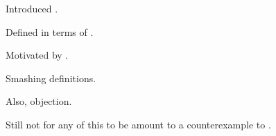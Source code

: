 \begin{note}
  Introduced .

  Defined in terms of \tC{}.

  Motivated by \tC{}.
\end{note}

\begin{note}
  Smashing definitions.
\end{note}

\begin{note}
  Also, objection.
\end{note}

\begin{note}
  Still not  for any of this to be amount to a counterexample to \issueConstraint{}.
\end{note}












